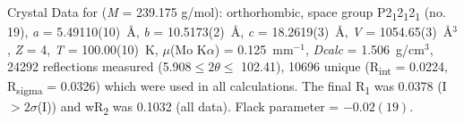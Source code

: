 \begin{refsection}
Crystal Data for   (\emph{M} = 239.175 g/mol): orthorhombic, space group P2\textsubscript{1}2\textsubscript{1}2\textsubscript{1} (no. 19), \emph{a} = 5.49110(10)~\AA, \emph{b} = 10.5173(2)~\AA, \emph{c} = 18.2619(3)~\AA, \emph{V} = 1054.65(3)~\AA$^3$, \emph{Z} = 4, \emph{T} = 100.00(10)~K, $\mu$(Mo K$\alpha$) = 0.125~mm$^{-1}$, \emph{Dcalc} = 1.506~g/cm$^3$, 24292 reflections measured (5.908\degree $\leq 2\theta \leq$ 102.41\degree), 10696 unique (R\textsubscript{int} = 0.0224, R\textsubscript{sigma} = 0.0326) which were used in all calculations. The final R\textsubscript{1} was 0.0378 (I $> 2\sigma$(I)) and wR\textsubscript{2} was 0.1032 (all data). Flack parameter = $-0.02(19)$.

\printbibliography
\end{refsection}

